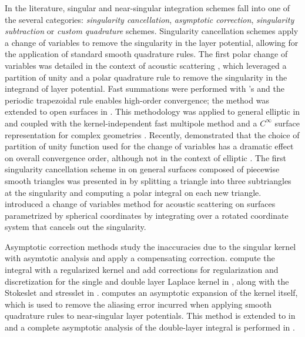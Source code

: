 In the \bie literature, singular and near-singular integration schemes fall into one of the several categories: \textit{singularity cancellation},  \textit{asymptotic correction}, \textit{singularity subtraction} or \textit{custom quadrature} schemes.
Singularity cancellation schemes apply a change of variables to remove the singularity in the layer potential, allowing for the application of standard smooth quadrature rules. 
The first polar change of variables was detailed in the context of acoustic scattering \cite{bruno2001fast}, which leveraged a partition of unity and a polar quadrature rule to remove the singularity in the integrand of layer potential.
Fast summations were performed with \fft's and the periodic trapezoidal rule enables high-order convergence; the method was extended to open surfaces in \cite{bruno2013high}.
This methodology was applied to general elliptic \pdes in \cite{YBZ} and coupled with the kernel-independent fast multipole method \cite{ying2004kernel} and a $C^\infty$ surface representation for complex geometries \cite{ying2004simple}.
Recently, \cite{malhotra2019taylor} demonstrated that the choice of partition of unity function used for the change of variables has a dramatic effect on overall convergence order, although not in the context of elliptic \pdes.
The first singularity cancellation scheme in \threed on general surfaces composed of piecewise smooth triangles was presented in \cite{bremer2012nystrom,bremer2013numerical} by splitting a triangle into three subtriangles at the singularity and computing a polar integral on each new triangle.
\cite{ganesh2004high} introduced a change of variables method for acoustic scattering on \threed surfaces parametrized by spherical coordinates by integrating over a rotated coordinate system that cancels out the singularity.

Asymptotic correction methods study the inaccuracies due to the singular \pde kernel with asymtotic analysis and apply a compensating correction. %
\cite{beale2004grid,beale2016simple,tlupova2019regularized} compute the integral with a regularized kernel and add corrections for regularization and discretization for the single and double layer Laplace kernel in \threed, along with the Stokeslet and stresslet in \threed.
\cite{carvalho2018asymptotic1} computes an asymptotic expansion of the kernel itself, which is used to remove the aliasing error incurred when applying smooth quadrature rules to near-singular layer potentials. 
This method is extended to \threed in \cite{carvalho2018asymptotic} and a complete asymptotic analysis of the double-layer integral is performed in \cite{khatri2020close}.

